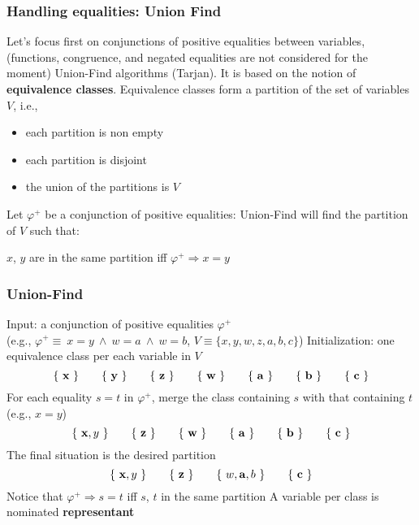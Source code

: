 \begin{frame}
  \frametitle{Handling equalities: Union Find}

  \vfill
  Let's focus first on conjunctions of positive equalities 
  between variables, (functions, congruence, and negated
  equalities are not considered for the moment)
  \vfill\pause
  Union-Find algorithms (Tarjan). It is based on the notion
  of {\bf equivalence classes}. Equivalence classes
  form a partition of the set of variables $V$, i.e.,
  \begin{itemize}
    \item each partition is non empty
    \item each partition is disjoint
    \item the union of the partitions is $V$
  \end{itemize}
  \vfill\pause
  Let $\varphi^+$ be a conjunction of positive equalities: 
  Union-Find will find the partition of $V$ such that:
  \vfill
  \begin{center}
    $x$, $y$ are in the same partition iff $\varphi^+ \Rightarrow x=y$
  \end{center}

\end{frame}

\begin{frame}
  \frametitle{Union-Find}

  Input: a conjunction of positive equalities $\varphi^+$\\
  (e.g., $\varphi^+ \equiv\ x\!=\!y\ \wedge\ w\!=\!a\ \wedge\ w\!=\!b$, $V \equiv \{ x,y,w,z,a,b,c \}$) 
  \vfill
  Initialization: one equivalence class per each variable in $V$
  $$
  \{\ {\bf x}\ \}\quad\quad\{\ {\bf y}\ \}\quad\quad\{\ {\bf z}\ \}\quad\quad
  \{\ {\bf w}\ \}\quad\quad\{\ {\bf a}\ \}\quad\quad\{\ {\bf b}\ \}\quad\quad\{\ {\bf c}\ \}
  $$
  \vfill\pause
  For each equality $s=t$ in $\varphi^+$, merge the class containing $s$ with that containing $t$ (e.g., $x=y$)
  $$
  \{\ {\bf x}, y\ \}\quad\quad\{\ {\bf z}\ \}\quad\quad\{\ {\bf w}\ \}\quad\quad\{\ {\bf a}\ \}\quad\quad\{\ {\bf b}\ \}\quad\quad\{\ {\bf c}\ \}
  $$
  \vfill\pause
  The final situation is the desired partition
  $$
  \{\ {\bf x}, y\ \}\quad\quad\{\ {\bf z}\ \}\quad\quad\{\ w, {\bf a}, b\ \}\quad\quad\{\ {\bf c}\ \}
  $$
  Notice that $\varphi^+ \Rightarrow s=t$ iff $s$, $t$ in the same partition
  \vfill
  A variable per class is nominated {\bf representant}

\end{frame}

